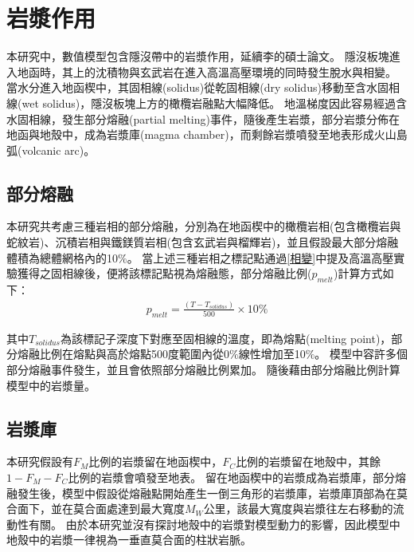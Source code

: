 \section{岩漿作用}
本研究中，數值模型包含隱沒帶中的岩漿作用，延續李的碩士論文。
隱沒板塊進入地函時，其上的沈積物與玄武岩在進入高溫高壓環境的同時發生脫水與相變。
當水分進入地函楔中，其固相線(solidus)從乾固相線(dry solidus)移動至含水固相線(wet solidus)，隱沒板塊上方的橄欖岩融點大幅降低。
地溫梯度因此容易經過含水固相線，發生部分熔融(partial melting)事件，隨後產生岩漿，部分岩漿分佈在地函與地殼中，成為岩漿庫(magma chamber)，而剩餘岩漿噴發至地表形成火山島弧(volcanic arc)。
\subsection{部分熔融}\label{部分熔融}
本研究共考慮三種岩相的部分熔融，分別為在地函楔中的橄欖岩相(包含橄欖岩與蛇紋岩)、沉積岩相與鐵鎂質岩相(包含玄武岩與榴輝岩)，並且假設最大部分熔融體積為總體網格內的10$\%$。
當上述三種岩相之標記點通過\ref{相變}中提及高溫高壓實驗獲得之固相線後，便將該標記點視為熔融態，部分熔融比例($p_{melt}$)計算方式如下：
\begin{align}
    p_{melt}=\frac{(T-T_{solidus})}{500}\times 10\% \label{eq:melting}
\end{align}

其中$T_{solidus}$為該標記子深度下對應至固相線的溫度，即為熔點(melting point)，部分熔融比例在熔點與高於熔點500度範圍內從0$\%$線性增加至10$\%$。
模型中容許多個部分熔融事件發生，並且會依照部分熔融比例累加。
隨後藉由部分熔融比例計算模型中的岩漿量。


\subsection{岩漿庫}\label{岩漿庫}
本研究假設有$F_M$比例的岩漿留在地函楔中，$F_C$比例的岩漿留在地殼中，其餘$1-F_M-F_C$比例的岩漿會噴發至地表。
留在地函楔中的岩漿成為岩漿庫，部分熔融發生後，模型中假設從熔融點開始產生一倒三角形的岩漿庫，岩漿庫頂部為在莫合面下，並在莫合面處達到最大寬度$M_W$公里，該最大寬度與岩漿往左右移動的流動性有關。
由於本研究並沒有探討地殼中的岩漿對模型動力的影響，因此模型中地殼中的岩漿一律視為一垂直莫合面的柱狀岩脈。

